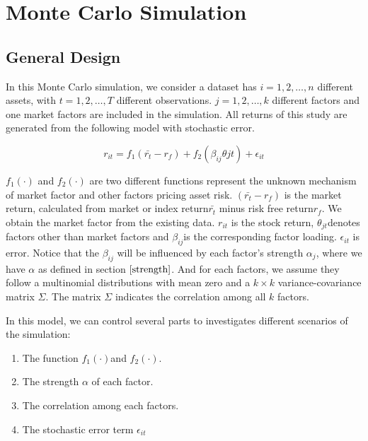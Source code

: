 \documentclass[12pt]{article}
\begin{document}
	\section{Monte Carlo Simulation}\label{MC}
	\subsection{General Design}
In this Monte Carlo simulation, we consider a dataset has $i = 1, 2,\dots, n$ different assets, with $t= 1, 2,\dots, T$ different observations. 
$j = 1, 2, \dots, k$ different factors and one market factors are included in the simulation. 
All returns of this study are generated from the following model with stochastic error.

\[  r_{it} = f_1(\bar{r_{t}} - r_f) + f_2( \beta_{ij}\theta{jt}) +\epsilon_{it}  \]

$f_1(\cdot)$ and $f_2(\cdot)$ are two different functions represent the unknown mechanism of market factor and other factors pricing asset risk.
$(\bar{r_{t}}- r_f) $ is the market return, calculated from market or index return$\bar{r_{t}}$ minus risk free return$r_f$. 
We obtain the market factor from the existing data. 
$r_{it}$ is the stock return, $\theta_{jt}$denotes factors other than market factors and $\beta_{ij}$is the corresponding factor loading. 
$\epsilon_{it}$ is error. 
Notice that the $\beta_{ij}$ will be influenced by each factor's strength $\alpha_j$, where we have $\alpha$ as defined in section $\ref{strength}$. 
And for each factors, we assume they follow a multinomial distributions  with mean zero and a $k\times k$ variance-covariance matrix $\Sigma$. 
The matrix $\Sigma$ indicates the correlation among  all $k$ factors. 

In this model, we can control several parts to investigates different scenarios of the simulation:
\begin{enumerate}
	\item The function $f_1(\cdot)$and $f_2(\cdot)$.
	\item The strength $\alpha$ of each factor.
	\item The correlation among each factors.
	\item The stochastic error term $\epsilon_{it}$
\end{enumerate}
\end{document}
